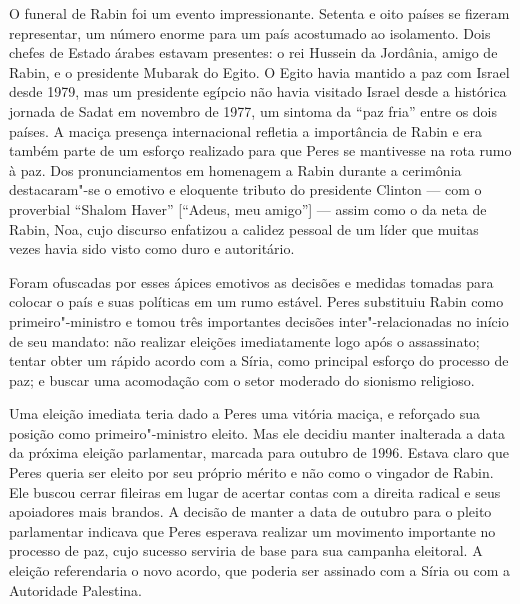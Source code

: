 O funeral de Rabin foi um evento impressionante. Setenta e oito países
se fizeram representar, um número enorme para um país acostumado ao
isolamento. Dois chefes de Estado árabes estavam presentes: o rei
Hussein da Jordânia, amigo de Rabin, e o presidente Mubarak do Egito.
O Egito havia mantido a paz com Israel desde 1979, mas um presidente
egípcio não havia visitado Israel desde a histórica jornada de Sadat em
novembro de 1977, um sintoma da ``paz fria'' entre os dois países. A
maciça presença internacional refletia a importância de Rabin e era
também parte de um esforço realizado para que Peres se mantivesse na
rota rumo à paz. Dos pronunciamentos em homenagem a Rabin durante a cerimônia
destacaram"-se o emotivo e eloquente tributo do presidente Clinton --- com
o proverbial ``Shalom Haver'' {[}``Adeus, meu amigo''{]} --- assim como o da
neta de Rabin, Noa, cujo discurso enfatizou a calidez pessoal de um
líder que muitas vezes havia sido visto como duro e autoritário.

Foram ofuscadas por esses ápices emotivos as decisões e medidas tomadas
para colocar o país e suas políticas em um rumo estável. Peres
substituiu Rabin como primeiro"-ministro e tomou três importantes
decisões inter"-relacionadas no início de seu mandato: não realizar
eleições imediatamente logo após o assassinato; tentar obter um rápido
acordo com a Síria, como principal esforço do processo de paz; e buscar
uma acomodação com o setor moderado do sionismo religioso.

Uma eleição imediata teria dado a Peres uma vitória maciça, e
reforçado sua posição como primeiro"-ministro eleito. Mas ele decidiu
manter inalterada a data da próxima eleição parlamentar, marcada para
outubro de 1996. Estava claro que Peres queria ser eleito por seu
próprio mérito e não como o vingador de Rabin. Ele buscou cerrar
fileiras em lugar de acertar contas com a direita radical e seus
apoiadores mais brandos. A decisão de manter a data de outubro para o
pleito parlamentar indicava que Peres esperava realizar um
movimento importante no processo de paz, cujo sucesso serviria de base para sua campanha eleitoral. A eleição referendaria o novo acordo, que poderia ser
assinado com a Síria ou com a Autoridade Palestina.

